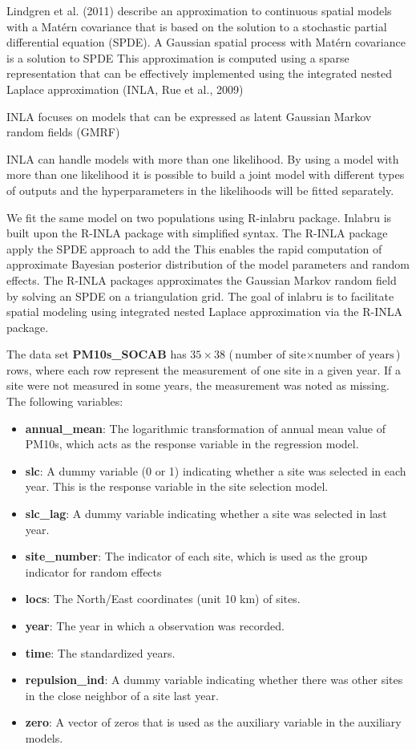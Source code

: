 Lindgren et al. (2011) describe an approximation to continuous spatial models with a Matérn
covariance that is based on the solution to a stochastic partial differential equation (SPDE). 
A Gaussian spatial process with Matérn covariance is a solution to SPDE
This approximation is computed using a sparse representation that can be effectively implemented using the integrated nested Laplace approximation (INLA, Rue et al., 2009)

INLA focuses on models that can be expressed as latent Gaussian Markov random fields (GMRF)

INLA can handle models with more than one likelihood. By using a model with more than one likelihood it is possible to build a joint model with different types of outputs and the hyperparameters in the likelihoods will be fitted separately.

We fit the same model on two populations using R-inlabru package. Inlabru is built upon the R-INLA 
package with simplified syntax. The R-INLA package apply the SPDE approach to add the
This enables the rapid computation of approximate Bayesian posterior distribution of the model 
parameters and random effects. The R-INLA packages approximates the Gaussian Markov random field by
solving an SPDE on a triangulation grid.
The goal of inlabru is to facilitate spatial modeling using integrated nested Laplace approximation via the R-INLA package.

The data set \textbf{PM10s\_SOCAB} has $35 \times 38$ ($\text{number of site} \times \text{number of years}$) 
rows, where each row represent the measurement of one site in a given year. If a site were not
measured in some years, the measurement was noted as missing.  The following variables:
\begin{itemize}
	\item \textbf{annual\_mean}: The logarithmic transformation of annual mean value of PM10s, which acts as the response variable in the regression model.
	\item \textbf{slc}: A dummy variable (0 or 1) indicating whether a site was selected in each year.
	This is the response variable in the site selection model.
	\item \textbf{slc\_lag}: A dummy variable indicating whether a site was selected in last year.
	\item \textbf{site\_number}: The indicator of each site, which is used as the group indicator for random effects
	\item \textbf{locs}: The North/East coordinates (unit 10 km) of sites.
	\item \textbf{year}: The year in which a observation was recorded.
	\item \textbf{time}: The standardized years. 
	\item \textbf{repulsion\_ind}: A dummy variable indicating whether there was other sites in the close neighbor of a site last year.
	\item \textbf{zero}: A vector of zeros that is used as the auxiliary variable in the auxiliary models.
\end{itemize}

